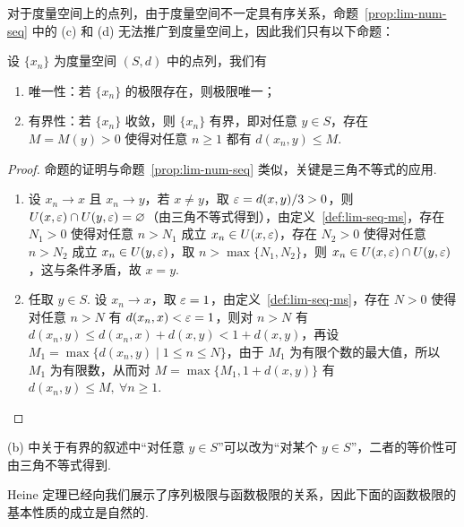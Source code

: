 \documentclass[../main.tex]{subfiles}
\begin{document}
对于度量空间上的点列，由于度量空间不一定具有序关系，命题~\ref{prop:lim-num-seq} 中的 (c) 和 (d) 无法推广到度量空间上，因此我们只有以下命题：

\begin{proposition}[度量空间上点列极限的基本性质] \label{prop:lim-seq-ms}
    设 $\{x_n\}$ 为度量空间 $(S, d)$ 中的点列，我们有
    \begin{enumerate}[label=(\alph*)]
        \item 唯一性：若 $\{x_n\}$ 的极限存在，则极限唯一；
        \item 有界性：若 $\{x_n\}$ 收敛，则 $\{x_n\}$ 有界，即对任意 $y \in S$，存在 $M = M(y) > 0$ 使得对任意 $n \geqslant 1$ 都有 $d(x_n, y) \leqslant M$. 
    \end{enumerate}
\end{proposition}

\begin{proof}
    命题的证明与命题~\ref{prop:lim-num-seq} 类似，关键是三角不等式的应用. 
    \begin{enumerate}[label=(\alph*)]
        \item 设 $x_n \to x$ 且 $x_n \to y$，若 $x \neq y$，取 $\varepsilon = d(x, y) / 3 > 0$，则 $U(x, \varepsilon) \cap U(y, \varepsilon) = \varnothing$（由三角不等式得到），由定义~\ref{def:lim-seq-ms}，存在 $N_1 > 0$ 使得对任意 $n > N_1$ 成立 $x_n \in U(x, \varepsilon)$，存在 $N_2 > 0$ 使得对任意 $n > N_2$ 成立 $x_n \in U(y, \varepsilon)$，取 $n > \max\{N_1, N_2\}$，则 $x_n \in U(x, \varepsilon) \cap U(y, \varepsilon)$，这与条件矛盾，故 $x = y$. 

        \item 任取 $y \in S$. 设 $x_n \to x$，取 $\varepsilon = 1$，由定义~\ref{def:lim-seq-ms}，存在 $N > 0$ 使得对任意 $n > N$ 有 $d(x_n, x) < \varepsilon = 1$，则对 $n > N$ 有 $d(x_n, y) \leqslant d(x_n, x) + d(x, y) < 1 + d(x, y)$，再设 $M_1 = \max\{d(x_n, y) \mid 1 \leqslant n \leqslant N\}$，由于 $M_1$ 为有限个数的最大值，所以 $M_1$ 为有限数，从而对 $M = \max\{M_1, 1 + d(x, y)\}$ 有 $d(x_n, y) \leqslant M, \ \forall n \geqslant 1$. \qedhere
    \end{enumerate}
\end{proof}

\begin{remark}
    (b) 中关于有界的叙述中“对任意 $y \in S$”可以改为“对某个 $y \in S$”，二者的等价性可由三角不等式得到. 
\end{remark}

Heine 定理已经向我们展示了序列极限与函数极限的关系，因此下面的函数极限的基本性质的成立是自然的. 
\end{document}

